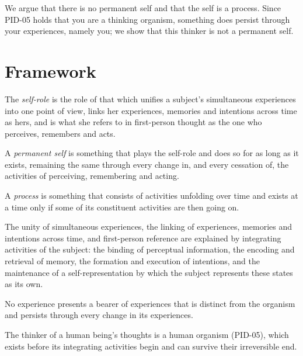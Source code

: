 \documentclass{situationist-preprint}
\begin{document}
We argue that there is no permanent self and that the self is a process. Since PID-05 holds that you are a thinking organism, something does persist through your experiences, namely you; we show that this thinker is not a permanent self.

\section{Framework}\label{s:frame}

\begin{definition}\label{d:role}
The \emph{self-role} is the role of that which unifies a subject's simultaneous experiences into one point of view, links her experiences, memories and intentions across time as hers, and is what she refers to in first-person thought as the one who perceives, remembers and acts.
\end{definition}

\begin{definition}\label{d:perm}
A \emph{permanent self} is something that plays the self-role and does so for as long as it exists, remaining the same through every change in, and every cessation of, the activities of perceiving, remembering and acting.
\end{definition}

\begin{definition}\label{d:process}
A \emph{process} is something that consists of activities unfolding over time and exists at a time only if some of its constituent activities are then going on.
\end{definition}

\begin{assumption}\label{a:explain}
The unity of simultaneous experiences, the linking of experiences, memories and intentions across time, and first-person reference are explained by integrating activities of the subject: the binding of perceptual information, the encoding and retrieval of memory, the formation and execution of intentions, and the maintenance of a self-representation by which the subject represents these states as its own.
\end{assumption}

\begin{assumption}\label{a:hume}
No experience presents a bearer of experiences that is distinct from the organism and persists through every change in its experiences.
\end{assumption}

\begin{assumption}\label{a:org}
The thinker of a human being's thoughts is a human organism (PID-05), which exists before its integrating activities begin and can survive their irreversible end.
\end{assumption}
\end{document}
